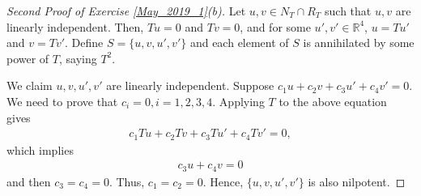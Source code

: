 \documentclass[11pt]{article}
\theoremstyle{definition}
\numberwithin{equation}{subsection}
\begin{document}
\begin{proof}[Second Proof of Exercise \ref{May_2019_1}(b)]
Let $u,v \in N_T \cap R_T$ such that $u, v$ are linearly independent. Then, $Tu = 0$ and $Tv = 0$, and for some $u', v' \in \mathbb{R}^4$, $u = Tu'$ and $v = Tv'$. Define $S = \{u, v, u', v'\}$ and each element of $S$ is annihilated by some power of $T$, saying $T^2$. 

We claim $u, v, u', v'$ are linearly independent. Suppose $c_1 u + c_2 v + c_3 u' + c_4 v' = 0$. We need to prove that $c_i = 0, i = 1,2,3,4$. Applying $T$ to the above equation gives
\begin{align*}
    c_1 T u + c_2 T v + c_3 T u' + c_4 T v' = 0,
\end{align*}
which implies
\begin{align*}
    c_3 u + c_4 v = 0
\end{align*}
and then $c_3 = c_4 = 0$. Thus, $c_1 = c_2 = 0$. Hence, $\{u, v, u', v'\}$ is also nilpotent.
\end{proof}

\medskip
\end{document}
